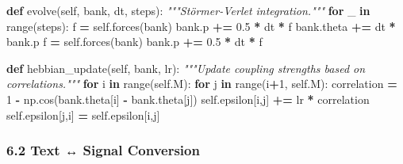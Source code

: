 \documentclass[
  11pt,
  a4paper,
]{article}
\newenvironment{Shaded}{\begin{snugshade}}{\end{snugshade}}
\newcommand{\BuiltInTok}[1]{#1}
\newcommand{\CommentTok}[1]{\textcolor[rgb]{0.56,0.35,0.01}{\textit{#1}}}
\newcommand{\ControlFlowTok}[1]{\textcolor[rgb]{0.13,0.29,0.53}{\textbf{#1}}}
\newcommand{\DecValTok}[1]{\textcolor[rgb]{0.00,0.00,0.81}{#1}}
\newcommand{\FloatTok}[1]{\textcolor[rgb]{0.00,0.00,0.81}{#1}}
\newcommand{\KeywordTok}[1]{\textcolor[rgb]{0.13,0.29,0.53}{\textbf{#1}}}
\newcommand{\NormalTok}[1]{#1}
\newcommand{\OperatorTok}[1]{\textcolor[rgb]{0.81,0.36,0.00}{\textbf{#1}}}
\newcommand{\VariableTok}[1]{\textcolor[rgb]{0.00,0.00,0.00}{#1}}
\begin{document}
\begin{Shaded}
\begin{Highlighting}[]
    \KeywordTok{def}\NormalTok{ evolve(}\VariableTok{self}\NormalTok{, bank, dt, steps):}
        \CommentTok{"""Störmer{-}Verlet integration."""}
        \ControlFlowTok{for}\NormalTok{ \_ }\KeywordTok{in} \BuiltInTok{range}\NormalTok{(steps):}
\NormalTok{            f }\OperatorTok{=} \VariableTok{self}\NormalTok{.forces(bank)}
\NormalTok{            bank.p }\OperatorTok{+=} \FloatTok{0.5} \OperatorTok{*}\NormalTok{ dt }\OperatorTok{*}\NormalTok{ f}
\NormalTok{            bank.theta }\OperatorTok{+=}\NormalTok{ dt }\OperatorTok{*}\NormalTok{ bank.p}
\NormalTok{            f }\OperatorTok{=} \VariableTok{self}\NormalTok{.forces(bank)}
\NormalTok{            bank.p }\OperatorTok{+=} \FloatTok{0.5} \OperatorTok{*}\NormalTok{ dt }\OperatorTok{*}\NormalTok{ f}
    
    \KeywordTok{def}\NormalTok{ hebbian\_update(}\VariableTok{self}\NormalTok{, bank, lr):}
        \CommentTok{"""Update coupling strengths based on correlations."""}
        \ControlFlowTok{for}\NormalTok{ i }\KeywordTok{in} \BuiltInTok{range}\NormalTok{(}\VariableTok{self}\NormalTok{.M):}
            \ControlFlowTok{for}\NormalTok{ j }\KeywordTok{in} \BuiltInTok{range}\NormalTok{(i}\OperatorTok{+}\DecValTok{1}\NormalTok{, }\VariableTok{self}\NormalTok{.M):}
\NormalTok{                correlation }\OperatorTok{=} \DecValTok{1} \OperatorTok{{-}}\NormalTok{ np.cos(bank.theta[i] }\OperatorTok{{-}}\NormalTok{ bank.theta[j])}
                \VariableTok{self}\NormalTok{.epsilon[i,j] }\OperatorTok{+=}\NormalTok{ lr }\OperatorTok{*}\NormalTok{ correlation}
                \VariableTok{self}\NormalTok{.epsilon[j,i] }\OperatorTok{=} \VariableTok{self}\NormalTok{.epsilon[i,j]}
\end{Highlighting}
\end{Shaded}

\subsubsection{6.2 Text ↔ Signal
Conversion}\label{text-signal-conversion}
\end{document}
